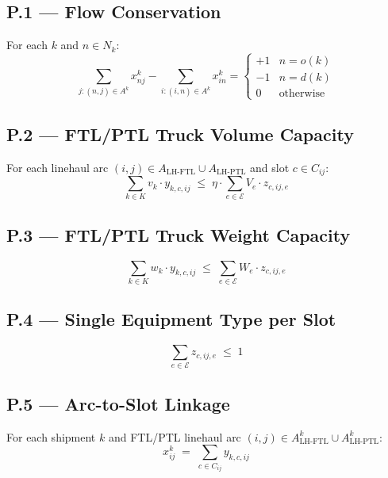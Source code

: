 \documentclass[11pt,a4paper]{article}
\theoremstyle{definition}
\begin{document}
\subsection*{P.1 — Flow Conservation}
For each $k$ and $n \in N_k$:
\begin{equation}
  \sum_{j : (n,j) \in A^k} x_{nj}^k - \sum_{i : (i,n) \in A^k} x_{in}^k =
  \begin{cases} +1 & n = o(k) \\ -1 & n = d(k) \\ 0 & \text{otherwise} \end{cases}
  \label{eq:tk-P1}
\end{equation}

\subsection*{P.2 — FTL/PTL Truck Volume Capacity}
For each linehaul arc $(i,j) \in A_{\text{LH-FTL}} \cup A_{\text{LH-PTL}}$ and slot $c \in C_{ij}$:
\begin{equation}
  \sum_{k \in K} v_k \cdot y_{k,c,ij} \;\leq\; \eta \cdot \sum_{e \in \mathcal{E}} V_e \cdot z_{c,ij,e}
  \label{eq:tk-P2}
\end{equation}

\subsection*{P.3 — FTL/PTL Truck Weight Capacity}
\begin{equation}
  \sum_{k \in K} w_k \cdot y_{k,c,ij} \;\leq\; \sum_{e \in \mathcal{E}} W_e \cdot z_{c,ij,e}
  \label{eq:tk-P3}
\end{equation}

\subsection*{P.4 — Single Equipment Type per Slot}
\begin{equation}
  \sum_{e \in \mathcal{E}} z_{c,ij,e} \;\leq\; 1
  \label{eq:tk-P4}
\end{equation}

\subsection*{P.5 — Arc-to-Slot Linkage}
For each shipment $k$ and FTL/PTL linehaul arc $(i,j) \in A^k_{\text{LH-FTL}} \cup A^k_{\text{LH-PTL}}$:
\begin{equation}
  x_{ij}^k \;=\; \sum_{c \in C_{ij}} y_{k,c,ij}
  \label{eq:tk-P5}
\end{equation}
\end{document}
